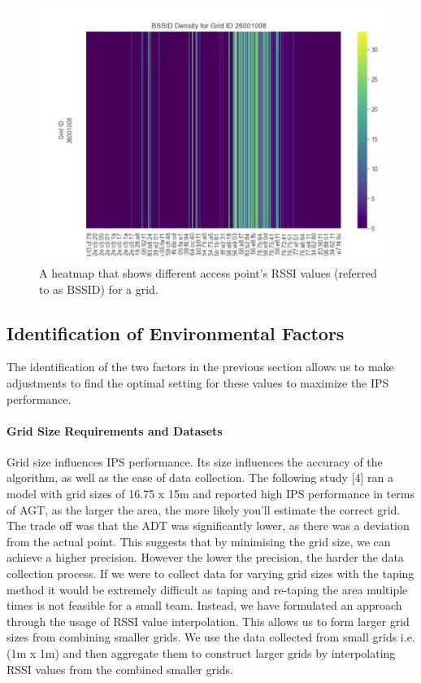 \documentclass[conference]{IEEEtran}
\begin{document}
	\begin{figure}[htbp]
		\centerline{\includegraphics[scale=0.15]{meth3.jpg}}
		\caption{A heatmap that shows different access point’s RSSI values (referred to as BSSID) for a grid.}
		\label{fig:heatmap008}
	\end{figure}
	
	
	\subsection{Identification of Environmental Factors}
	The identification of the two factors in the previous section allows us to make adjustments to find the optimal setting for these values to maximize the IPS performance.
	
	\paragraph{Grid Size Requirements and Datasets} Grid size influences IPS performance. Its size influences the accuracy of the algorithm, as well as the ease of data collection. The following study [4] ran a model with grid sizes of 16.75 x 15m and reported high IPS performance in terms of AGT, as the larger the area, the more likely you’ll estimate the correct grid. The trade off was that the ADT was significantly lower, as there was a deviation from the actual point. This suggests that by minimising the grid size, we can achieve a higher precision. However the lower the precision, the harder the data collection process. 
	If we were to collect data for varying grid sizes with the taping method it would be extremely difficult as taping and re-taping the area multiple times is not feasible for a small team. Instead, we have formulated an approach through the usage of RSSI value interpolation. This allows us to form larger grid sizes from combining smaller grids. We use the data collected from small grids i.e. (1m x 1m) and then aggregate them to construct larger grids by interpolating RSSI values from the combined smaller grids.
	
\end{document}
